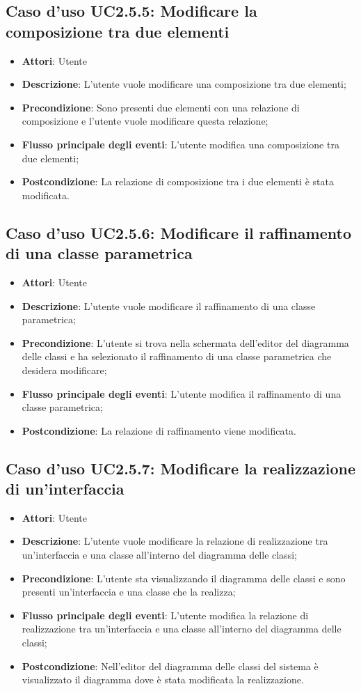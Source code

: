 \documentclass[../AnalisiDeiRequisiti.tex]{subfiles}
\begin{document}
		\subsection{Caso d'uso UC2.5.5: Modificare la composizione tra due elementi}
		\begin{itemize}
			\item \textbf{Attori}: Utente
			\item \textbf{Descrizione}: L'utente vuole modificare una composizione tra due elementi;
			\item \textbf{Precondizione}: Sono presenti due elementi con una relazione di composizione e l'utente vuole modificare questa relazione;
			\item \textbf{Flusso principale degli eventi}: L'utente modifica una composizione tra due elementi;
			\item \textbf{Postcondizione}: La relazione di composizione tra i due elementi è stata modificata.	
		\end{itemize}
		\subsection{Caso d'uso UC2.5.6: Modificare il raffinamento di una classe parametrica}
		\begin{itemize}
			\item \textbf{Attori}: Utente
			\item \textbf{Descrizione}: L'utente vuole modificare il raffinamento di una classe parametrica;
			\item \textbf{Precondizione}: L'utente si trova nella schermata dell'editor del diagramma delle classi e ha selezionato il raffinamento di una classe parametrica che desidera modificare;
			\item \textbf{Flusso principale degli eventi}: L'utente modifica il raffinamento di una classe parametrica;
			\item \textbf{Postcondizione}: La relazione di raffinamento viene modificata.
		\end{itemize}
		\subsection{Caso d'uso UC2.5.7: Modificare la realizzazione di un'interfaccia}
		\begin{itemize}
			\item \textbf{Attori}: Utente
			\item \textbf{Descrizione}: L'utente vuole modificare la relazione di realizzazione tra un'interfaccia e una classe all'interno del diagramma delle classi;
			\item \textbf{Precondizione}: L'utente sta visualizzando il diagramma delle classi e sono presenti un'interfaccia e una classe che la realizza;
			\item \textbf{Flusso principale degli eventi}: L'utente modifica la relazione di realizzazione tra un'interfaccia e una classe all'interno del diagramma delle classi;
			\item \textbf{Postcondizione}: Nell'editor del diagramma delle classi del sistema è visualizzato il diagramma dove è stata modificata la realizzazione.
		\end{itemize}
\end{document}
